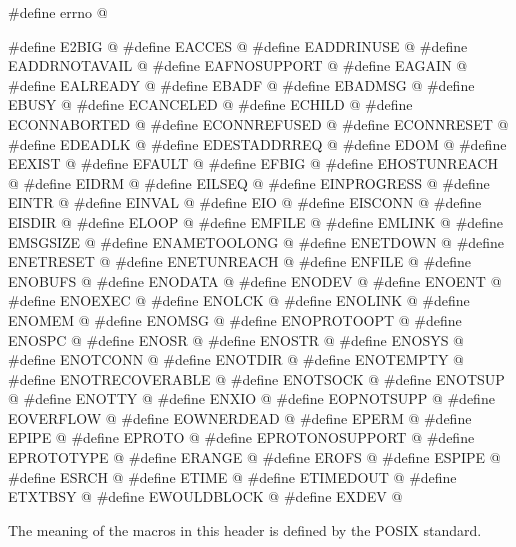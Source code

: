 \begin{codeblock}
#define errno @\seebelow@

#define E2BIG @\seebelow@
#define EACCES @\seebelow@
#define EADDRINUSE @\seebelow@
#define EADDRNOTAVAIL @\seebelow@
#define EAFNOSUPPORT @\seebelow@
#define EAGAIN @\seebelow@
#define EALREADY @\seebelow@
#define EBADF @\seebelow@
#define EBADMSG @\seebelow@
#define EBUSY @\seebelow@
#define ECANCELED @\seebelow@
#define ECHILD @\seebelow@
#define ECONNABORTED @\seebelow@
#define ECONNREFUSED @\seebelow@
#define ECONNRESET @\seebelow@
#define EDEADLK @\seebelow@
#define EDESTADDRREQ @\seebelow@
#define EDOM @\seebelow@
#define EEXIST @\seebelow@
#define EFAULT @\seebelow@
#define EFBIG @\seebelow@
#define EHOSTUNREACH @\seebelow@
#define EIDRM @\seebelow@
#define EILSEQ @\seebelow@
#define EINPROGRESS @\seebelow@
#define EINTR @\seebelow@
#define EINVAL @\seebelow@
#define EIO @\seebelow@
#define EISCONN @\seebelow@
#define EISDIR @\seebelow@
#define ELOOP @\seebelow@
#define EMFILE @\seebelow@
#define EMLINK @\seebelow@
#define EMSGSIZE @\seebelow@
#define ENAMETOOLONG @\seebelow@
#define ENETDOWN @\seebelow@
#define ENETRESET @\seebelow@
#define ENETUNREACH @\seebelow@
#define ENFILE @\seebelow@
#define ENOBUFS @\seebelow@
#define ENODATA @\seebelow@
#define ENODEV @\seebelow@
#define ENOENT @\seebelow@
#define ENOEXEC @\seebelow@
#define ENOLCK @\seebelow@
#define ENOLINK @\seebelow@
#define ENOMEM @\seebelow@
#define ENOMSG @\seebelow@
#define ENOPROTOOPT @\seebelow@
#define ENOSPC @\seebelow@
#define ENOSR @\seebelow@
#define ENOSTR @\seebelow@
#define ENOSYS @\seebelow@
#define ENOTCONN @\seebelow@
#define ENOTDIR @\seebelow@
#define ENOTEMPTY @\seebelow@
#define ENOTRECOVERABLE @\seebelow@
#define ENOTSOCK @\seebelow@
#define ENOTSUP @\seebelow@
#define ENOTTY @\seebelow@
#define ENXIO @\seebelow@
#define EOPNOTSUPP @\seebelow@
#define EOVERFLOW @\seebelow@
#define EOWNERDEAD @\seebelow@
#define EPERM @\seebelow@
#define EPIPE @\seebelow@
#define EPROTO @\seebelow@
#define EPROTONOSUPPORT @\seebelow@
#define EPROTOTYPE @\seebelow@
#define ERANGE @\seebelow@
#define EROFS @\seebelow@
#define ESPIPE @\seebelow@
#define ESRCH @\seebelow@
#define ETIME @\seebelow@
#define ETIMEDOUT @\seebelow@
#define ETXTBSY @\seebelow@
#define EWOULDBLOCK @\seebelow@
#define EXDEV @\seebelow@
\end{codeblock}

\pnum
The meaning of the macros in this header is defined by the POSIX standard.


